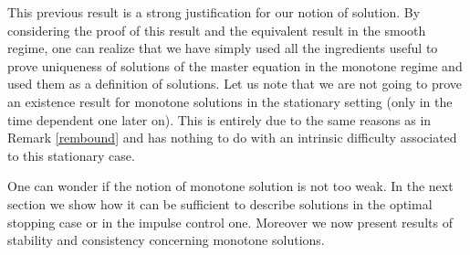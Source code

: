 \documentclass[JEP,XML,SOM,Unicode,NoEqCountersInSection,published]{cedram}
\theoremstyle{definition}
\begin{document}
This previous result is a strong justification for our notion of solution. By considering the proof of this result and the equivalent result in the smooth regime, one can realize that we have simply used all the ingredients useful to prove uniqueness of solutions of the master equation in the monotone regime and used them as a definition of solutions. Let us note that we are not going to prove an existence result for monotone solutions in the stationary setting (only in the time dependent one later on). This is entirely due to the same reasons as in Remark \ref{rembound} and has nothing to do with an intrinsic difficulty associated to this stationary case.

One can wonder if the notion of monotone solution is not too weak. In the next section we show how it can be sufficient to describe solutions in the optimal stopping case or in the impulse control one. Moreover we now present results of stability and consistency concerning monotone solutions.
\end{document}
